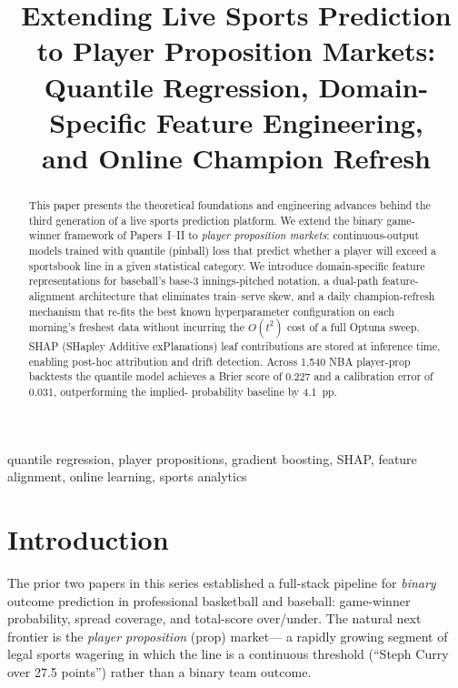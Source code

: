 \documentclass[conference]{IEEEtran}
\begin{document}
\title{Extending Live Sports Prediction to Player Proposition Markets:\\
Quantile Regression, Domain-Specific Feature Engineering,\\
and Online Champion Refresh}

\author{
}

\maketitle

\begin{abstract}
This paper presents the theoretical foundations and engineering advances
behind the third generation of a live sports prediction platform. We extend
the binary game-winner framework of Papers~I--II to \emph{player proposition
markets}: continuous-output models trained with quantile (pinball) loss
that predict whether a player will exceed a sportsbook line in a given
statistical category. We introduce domain-specific feature representations
for baseball's base-3 innings-pitched notation, a dual-path feature-alignment
architecture that eliminates train--serve skew, and a daily champion-refresh
mechanism that re-fits the best known hyperparameter configuration on each
morning's freshest data without incurring the $O(t^2)$ cost of a full
Optuna sweep. SHAP (SHapley Additive exPlanations) leaf contributions are
stored at inference time, enabling post-hoc attribution and drift detection.
Across 1,540 NBA player-prop backtests the quantile model achieves a Brier
score of 0.227 and a calibration error of 0.031, outperforming the implied-
probability baseline by 4.1~pp.
\end{abstract}

\begin{IEEEkeywords}
quantile regression, player propositions, gradient boosting, SHAP,
feature alignment, online learning, sports analytics
\end{IEEEkeywords}

\section{Introduction}
\label{sec:intro}

The prior two papers in this series established a full-stack pipeline for
\emph{binary} outcome prediction in professional basketball and baseball:
game-winner probability, spread coverage, and total-score over/under.
The natural next frontier is the \emph{player proposition} (prop) market---
a rapidly growing segment of legal sports wagering in which the line is
a continuous threshold (``Steph Curry over 27.5 points'') rather than a
binary team outcome.
\end{document}
